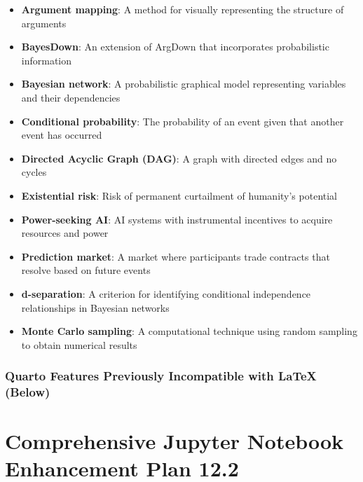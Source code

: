 \documentclass[
  11pt,
  letterpaper,
]{book}
\providecommand{\tightlist}{%
  \setlength{\itemsep}{0pt}\setlength{\parskip}{0pt}}
\begin{document}
\begin{itemize}
\tightlist
\item
  \textbf{Argument mapping}: A method for visually representing the
  structure of arguments\\
\item
  \textbf{BayesDown}: An extension of ArgDown that incorporates
  probabilistic information\\
\item
  \textbf{Bayesian network}: A probabilistic graphical model
  representing variables and their dependencies\\
\item
  \textbf{Conditional probability}: The probability of an event given
  that another event has occurred\\
\item
  \textbf{Directed Acyclic Graph (DAG)}: A graph with directed edges and
  no cycles\\
\item
  \textbf{Existential risk}: Risk of permanent curtailment of humanity's
  potential\\
\item
  \textbf{Power-seeking AI}: AI systems with instrumental incentives to
  acquire resources and power\\
\item
  \textbf{Prediction market}: A market where participants trade
  contracts that resolve based on future events\\
\item
  \textbf{d-separation}: A criterion for identifying conditional
  independence relationships in Bayesian networks\\
\item
  \textbf{Monte Carlo sampling}: A computational technique using random
  sampling to obtain numerical results
\end{itemize}

\subsection*{Quarto Features Previously Incompatible with LaTeX
(Below)}\label{quarto-features-previously-incompatible-with-latex-below}


\chapter{Comprehensive Jupyter Notebook Enhancement Plan
12.2}\label{comprehensive-jupyter-notebook-enhancement-plan-12.2}
\end{document}
